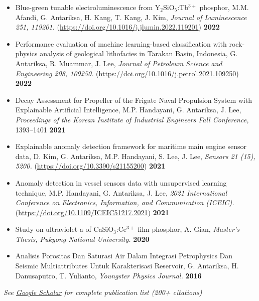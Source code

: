 \documentclass[10pt,a4paper]{article}
\begin{document}
\begin{itemize}
    \item Blue-green tunable electroluminescence from Y$_2$SiO$_5$:Tb$^{3+}$ phosphor, M.M. Afandi, G. Antariksa, H. Kang, T. Kang, J. Kim, \textit{Journal of Luminescence 251, 119201.} (\href{https://doi.org/10.1016/j.jlumin.2022.119201}{https://doi.org/10.1016/j.jlumin.2022.119201}) \textbf{2022}

    \item Performance evaluation of machine learning-based classification with rock-physics analysis of geological lithofacies in Tarakan Basin, Indonesia, G. Antariksa, R. Muammar, J. Lee, \textit{Journal of Petroleum Science and Engineering 208, 109250.} (\href{https://doi.org/10.1016/j.petrol.2021.109250}{https://doi.org/10.1016/j.petrol.2021.109250}) \textbf{2022}

    \item Decay Assessment for Propeller of the Frigate Naval Propulsion System with Explainable Artificial Intelligence, M.P. Handayani, G. Antariksa, J. Lee, \textit{Proceedings of the Korean Institute of Industrial Engineers Fall Conference,} 1393--1401 \textbf{2021}

    \item Explainable anomaly detection framework for maritime main engine sensor data, D. Kim, G. Antariksa, M.P. Handayani, S. Lee, J. Lee, \textit{Sensors 21 (15), 5200.} (\href{https://doi.org/10.3390/s21155200}{https://doi.org/10.3390/s21155200}) \textbf{2021}

    \item Anomaly detection in vessel sensors data with unsupervised learning technique, M.P. Handayani, G. Antariksa, J. Lee, \textit{2021 International Conference on Electronics, Information, and Communication (ICEIC).} (\href{https://doi.org/10.1109/ICEIC51217.2021}{https://doi.org/10.1109/ICEIC51217.2021}) \textbf{2021}

    \item Study on ultraviolet-a of CaSiO$_3$:Ce$^{3+}$ film phosphor, A. Gian, \textit{Master's Thesis, Pukyong National University.} \textbf{2020}

    \item Analisis Porositas Dan Saturasi Air Dalam Integrasi Petrophysics Dan Seismic Multiattributes Untuk Karakterisasi Reservoir, G. Antariksa, H. Danusaputro, T. Yulianto, \textit{Youngster Physics Journal.} \textbf{2016}

\end{itemize}

\textit{See \href{https://scholar.google.com/citations?user=5BawrcEAAAAJ\&hl=en}{Google Scholar} for complete publication list (200+ citations)}
\end{document}
